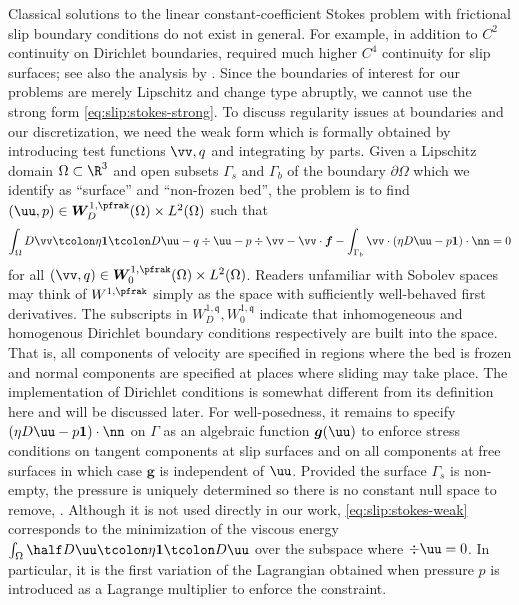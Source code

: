 Classical solutions to the linear constant-coefficient Stokes problem with frictional slip boundary conditions do not exist in general.
For example, in addition to $C^2$ continuity on Dirichlet boundaries, \citet{saito2004stokes} required much higher $C^4$ continuity for slip surfaces; see also the analysis by \citet{fujita2002coherent}.
Since the boundaries of interest for our problems are merely Lipschitz and change type abruptly, we cannot use the strong form \eqref{eq:slip:stokes-strong}.
To discuss regularity issues at boundaries and our discretization, we need the weak form which is formally obtained by introducing test functions $\vv,q$ and integrating by parts.
Given a Lipschitz domain $\Omega \subset \R^3$ and open subsets $\Gamma_s$ and $\Gamma_b$ of the boundary $\partial\Omega$ which we identify as ``surface'' and ``non-frozen bed'', the problem is to find $(\uu,p) \in \bm W_D^{1,\pfrak}(\Omega) \times L^2(\Omega)$ such that
\begin{equation}\label{eq:slip:stokes-weak}
  \int_\Omega D\vv\tcolon \eta\bm 1 \tcolon D\uu - q\div\uu - p\div\vv - \vv\cdot\bm f
  - \int_{\Gamma_b} \vv\cdot (\eta D\uu - p\bm 1)\cdot\nn = 0
\end{equation}
for all $(\vv,q)\in \bm W_0^{1,\pfrak}(\Omega) \times L^2(\Omega)$.
Readers unfamiliar with Sobolev spaces may think of $W^{1,\pfrak}$ simply as the space with sufficiently well-behaved first derivatives.
The subscripts in $W_D^{1,\mathfrak{q}},W_0^{1,\mathfrak{q}}$ indicate that inhomogeneous and homogenous Dirichlet boundary conditions respectively are built into the space.
That is, all components of velocity are specified in regions where the bed is frozen and normal components are specified at places where sliding may take place.
The implementation of Dirichlet conditions is somewhat different from its definition here and will be discussed later.
For well-posedness, it remains to specify $(\eta D\uu - p\bm 1)\cdot\nn$ on $\Gamma$ as an algebraic function $\bm g(\uu)$ to enforce stress conditions on tangent components at slip surfaces and on all components at free surfaces in which case $\bm g$ is independent of $\uu$.
Provided the surface $\Gamma_s$ is non-empty, the pressure is uniquely determined so there is no constant null space to remove, \cf {}.
Although it is not used directly in our work, \eqref{eq:slip:stokes-weak} corresponds to the minimization of the viscous energy $\int_\Omega \half D\uu\tcolon \eta\bm 1 \tcolon D\uu$ over the subspace where $\div\uu = 0$.
In particular, it is the first variation of the Lagrangian obtained when pressure $p$ is introduced as a Lagrange multiplier to enforce the constraint.
